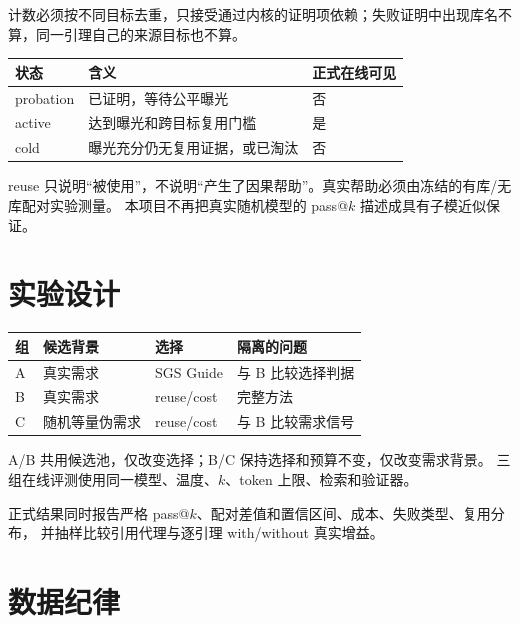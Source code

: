 \documentclass[UTF8,a4paper,11pt,fontset=windows]{ctexart}
\begin{document}
计数必须按不同目标去重，只接受通过内核的证明项依赖；失败证明中出现库名不算，同一引理自己的来源目标也不算。

\begin{table}[htbp]
\centering
\small
\begin{tabularx}{\textwidth}{@{}p{2.5cm}Yp{3cm}@{}}
\toprule
\textbf{状态} & \textbf{含义} & \textbf{正式在线可见} \\
\midrule
probation & 已证明，等待公平曝光 & 否 \\
active & 达到曝光和跨目标复用门槛 & 是 \\
cold & 曝光充分仍无复用证据，或已淘汰 & 否 \\
\bottomrule
\end{tabularx}
\end{table}

\begin{warnbox}
reuse 只说明“被使用”，不说明“产生了因果帮助”。真实帮助必须由冻结的有库/无库配对实验测量。
本项目不再把真实随机模型的 pass@$k$ 描述成具有子模近似保证。
\end{warnbox}

\section{实验设计}

\begin{table}[htbp]
\centering
\small
\begin{tabularx}{\textwidth}{@{}p{1cm}p{3.2cm}p{3.2cm}Y@{}}
\toprule
\textbf{组} & \textbf{候选背景} & \textbf{选择} & \textbf{隔离的问题} \\
\midrule
A & 真实需求 & SGS Guide & 与 B 比较选择判据 \\
B & 真实需求 & reuse/cost & 完整方法 \\
C & 随机等量伪需求 & reuse/cost & 与 B 比较需求信号 \\
\bottomrule
\end{tabularx}
\end{table}

A/B 共用候选池，仅改变选择；B/C 保持选择和预算不变，仅改变需求背景。
三组在线评测使用同一模型、温度、$k$、token 上限、检索和验证器。

正式结果同时报告严格 pass@$k$、配对差值和置信区间、成本、失败类型、复用分布，
并抽样比较引用代理与逐引理 with/without 真实增益。

\section{数据纪律}
\end{document}
